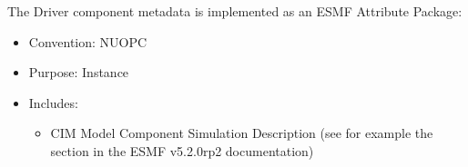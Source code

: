 \label{DriverCompMeta}
The Driver component metadata is implemented as an ESMF Attribute Package:

\begin{itemize}
    \item Convention: NUOPC
    \item Purpose: Instance
    \item Includes:
    \begin{itemize}
      \item CIM Model Component Simulation Description (see for example the  section in the ESMF v5.2.0rp2 documentation)
    \end{itemize} 
\end{itemize}


